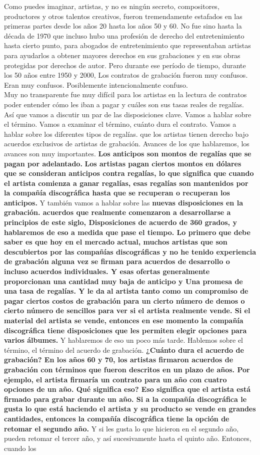 \documentclass[10pt]{book}
\begin{document}
Como puedes imaginar, artistas, y no es ningún secreto, compositores, productores y otros talentos creativos, fueron tremendamente estafados en las primeras partes desde los años 20 hasta los años 50 y 60. No fue sino hasta la década de 1970 que incluso hubo una profesión de derecho del entretenimiento hasta cierto punto, para abogados de entretenimiento que representaban artistas para ayudarlos a obtener mayores derechos en sus grabaciones y en sus obras protegidas por derechos de autor. Pero durante ese período de tiempo, durante los 50 años entre 1950 y 2000, Los contratos de grabación fueron muy confusos. Eran muy confusos. Posiblemente intencionalmente confuso.\\
Muy no transparente fue muy difícil para los artistas en la lectura de contratos poder entender cómo les iban a pagar y cuáles son sus tasas reales de regalías. Así que vamos a discutir un par de las disposiciones clave. Vamos a hablar sobre el término. Vamos a examinar el término, cuánto dura el contrato. Vamos a hablar sobre los diferentes tipos de regalías. que los artistas tienen derecho bajo acuerdos exclusivos de artistas de grabación. Avances de los que hablaremos, los avances son muy importantes. \textbf{Los anticipos son montos de regalías que se pagan por adelantado.} \textbf{Los artistas pagan ciertos montos en dólares que se consideran anticipos contra regalías, lo que significa que cuando el artista comienza a ganar regalías, esas regalías son mantenidos por la compañía discográfica hasta que se recuperan o recuperan los anticipos.} Y también vamos a hablar sobre las \textbf{nuevas disposiciones en la grabación. acuerdos que realmente comenzaron a desarrollarse a principios de este siglo, Disposiciones de acuerdo de 360 grados, y hablaremos de eso a medida que pase el tiempo. Lo primero que debe saber es que hoy en el mercado actual, muchos artistas que son descubiertos por las compañías discográficas y no he tenido experiencia de grabación alguna vez se firman para acuerdos de desarrollo o incluso acuerdos individuales. Y esas ofertas generalmente proporcionan una cantidad muy baja de anticipo y Una promesa de una tasa de regalías. Y le da al artista tanto como un compromiso de pagar ciertos costos de grabación para un cierto número de demos o cierto número de sencillos para ver si el artista realmente vende. Si el material del artista se vende, entonces en ese momento la compañía discográfica tiene disposiciones que les permiten elegir opciones para varios álbumes.} Y hablaremos de eso un poco más tarde. Hablemos sobre el término, el término del acuerdo de grabación. \textbf{¿Cuánto dura el acuerdo de grabación? En los años 60 y 70, los artistas firmaron acuerdos de grabación con términos que fueron descritos en un plazo de años. Por ejemplo, el artista firmaría un contrato para un año con cuatro opciones de un año. Qué significa eso? Eso significa que el artista está firmado para grabar durante un año. Si a la compañía discográfica le gusta lo que está haciendo el artista y su producto se vende en grandes cantidades, entonces la compañía discográfica tiene la opción de retomar el segundo año.} Y si les gusta lo que hicieron en el segundo año, pueden retomar el tercer año, y así sucesivamente hasta el quinto año. Entonces, cuando los 
\end{document}
